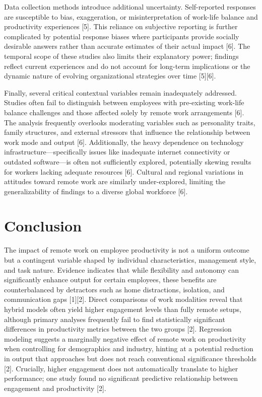 \documentclass[conference]{IEEEtran}
\begin{document}
Data collection methods introduce additional uncertainty. Self-reported responses are susceptible to bias, exaggeration, or misinterpretation of work-life balance and productivity experiences [5]. This reliance on subjective reporting is further complicated by potential response biases where participants provide socially desirable answers rather than accurate estimates of their actual impact [6]. The temporal scope of these studies also limits their explanatory power; findings reflect current experiences and do not account for long-term implications or the dynamic nature of evolving organizational strategies over time [5][6].

Finally, several critical contextual variables remain inadequately addressed. Studies often fail to distinguish between employees with pre-existing work-life balance challenges and those affected solely by remote work arrangements [6]. The analysis frequently overlooks moderating variables such as personality traits, family structures, and external stressors that influence the relationship between work mode and output [6]. Additionally, the heavy dependence on technology infrastructure—specifically issues like inadequate internet connectivity or outdated software—is often not sufficiently explored, potentially skewing results for workers lacking adequate resources [6]. Cultural and regional variations in attitudes toward remote work are similarly under-explored, limiting the generalizability of findings to a diverse global workforce [6].

\section{Conclusion}
The impact of remote work on employee productivity is not a uniform outcome but a contingent variable shaped by individual characteristics, management style, and task nature. Evidence indicates that while flexibility and autonomy can significantly enhance output for certain employees, these benefits are counterbalanced by detractors such as home distractions, isolation, and communication gaps [1][2]. Direct comparisons of work modalities reveal that hybrid models often yield higher engagement levels than fully remote setups, although primary analyses frequently fail to find statistically significant differences in productivity metrics between the two groups [2]. Regression modeling suggests a marginally negative effect of remote work on productivity when controlling for demographics and industry, hinting at a potential reduction in output that approaches but does not reach conventional significance thresholds [2]. Crucially, higher engagement does not automatically translate to higher performance; one study found no significant predictive relationship between engagement and productivity [2].
\end{document}
